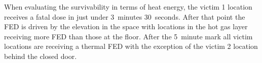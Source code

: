 \documentclass[12pt,oneside]{book}
\begin{document}
When evaluating the survivability in terms of heat energy, the victim 1 location receives a fatal dose in just under 3~minutes 30~seconds. After that point the FED is driven by the elevation in the space with locations in the hot gas layer receiving more FED than those at the floor. After the 5~minute mark all victim locations are receiving a thermal FED with the exception of the victim 2 location behind the closed door.  





\end{document}

